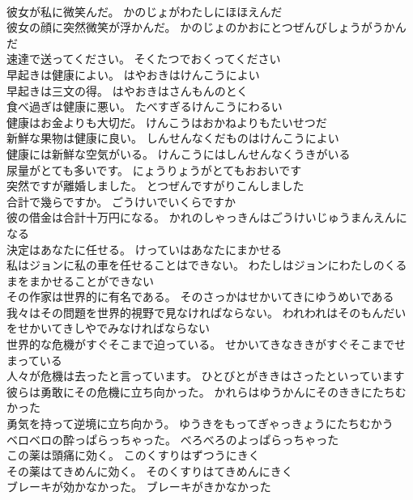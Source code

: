 \documentclass[8pt]{extreport}
\begin{document}
\begin{CJK}{UTF8}{min}
\\	彼女が私に微笑んだ。	かのじょがわたしにほほえんだ 
\\	彼女の顔に突然微笑が浮かんだ。	かのじょのかおにとつぜんびしょうがうかんだ 
\\	速達で送ってください。	そくたつでおくってください 
\\	早起きは健康によい。	はやおきはけんこうによい 
\\	早起きは三文の得。	はやおきはさんもんのとく 
\\	食べ過ぎは健康に悪い。	たべすぎるけんこうにわるい 
\\	健康はお金よりも大切だ。	けんこうはおかねよりもたいせつだ 
\\	新鮮な果物は健康に良い。	しんせんなくだものはけんこうによい 
\\	健康には新鮮な空気がいる。	けんこうにはしんせんなくうきがいる 
\\	尿量がとても多いです。	にょうりょうがとてもおおいです 
\\	突然ですが離婚しました。	とつぜんですがりこんしました 
\\	合計で幾らですか。	ごうけいでいくらですか 
\\	彼の借金は合計十万円になる。	かれのしゃっきんはごうけいじゅうまんえんになる 
\\	決定はあなたに任せる。	けっていはあなたにまかせる 
\\	私はジョンに私の車を任せることはできない。	わたしはジョンにわたしのくるまをまかせることができない 
\\	その作家は世界的に有名である。	そのさっかはせかいてきにゆうめいである 
\\	我々はその問題を世界的視野で見なければならない。	われわれはそのもんだいをせかいてきしやでみなければならない 
\\	世界的な危機がすぐそこまで迫っている。	せかいてきなききがすぐそこまでせまっている 
\\	人々が危機は去ったと言っています。	ひとびとがききはさったといっています 
\\	彼らは勇敢にその危機に立ち向かった。	かれらはゆうかんにそのききにたちむかった 
\\	勇気を持って逆境に立ち向かう。	ゆうきをもってぎゃっきょうにたちむかう 
\\	ベロベロの酔っぱらっちゃった。	べろべろのよっぱらっちゃった 
\\	この薬は頭痛に効く。	このくすりはずつうにきく 
\\	その薬はてきめんに効く。	そのくすりはてきめんにきく 
\\	ブレーキが効かなかった。	ブレーキがきかなかった 

\end{CJK}
\end{document}
